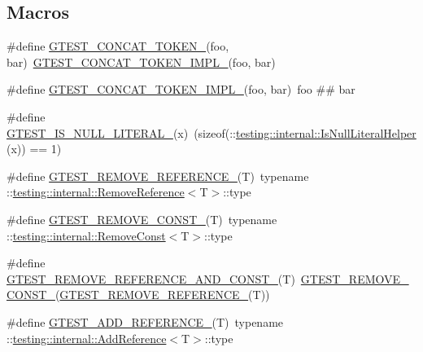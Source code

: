 \subsection*{Macros}
\begin{DoxyCompactItemize}
\item 
\#define \hyperlink{gtest-internal_8h_ae3c336cbe1ae2bd1b1d019333e4428a0}{G\+T\+E\+S\+T\+\_\+\+C\+O\+N\+C\+A\+T\+\_\+\+T\+O\+K\+E\+N\+\_\+}(foo,  bar)~\hyperlink{gtest-internal_8h_aa39fb5346d3573feebe4257cb3a01fde}{G\+T\+E\+S\+T\+\_\+\+C\+O\+N\+C\+A\+T\+\_\+\+T\+O\+K\+E\+N\+\_\+\+I\+M\+P\+L\+\_\+}(foo, bar)
\item 
\#define \hyperlink{gtest-internal_8h_aa39fb5346d3573feebe4257cb3a01fde}{G\+T\+E\+S\+T\+\_\+\+C\+O\+N\+C\+A\+T\+\_\+\+T\+O\+K\+E\+N\+\_\+\+I\+M\+P\+L\+\_\+}(foo,  bar)~foo \#\# bar
\item 
\#define \hyperlink{gtest-internal_8h_ae5dd8e23090e08856613878fa1ff6fca}{G\+T\+E\+S\+T\+\_\+\+I\+S\+\_\+\+N\+U\+L\+L\+\_\+\+L\+I\+T\+E\+R\+A\+L\+\_\+}(x)~(sizeof(\+::\hyperlink{namespacetesting_1_1internal_afb0731ba39ffef1fa1730ac0699c9025}{testing\+::internal\+::\+Is\+Null\+Literal\+Helper}(x)) == 1)
\item 
\#define \hyperlink{gtest-internal_8h_a84c72f25a6a6600e3ff8381ca6982ae9}{G\+T\+E\+S\+T\+\_\+\+R\+E\+M\+O\+V\+E\+\_\+\+R\+E\+F\+E\+R\+E\+N\+C\+E\+\_\+}(T)~typename \+::\hyperlink{structtesting_1_1internal_1_1_remove_reference}{testing\+::internal\+::\+Remove\+Reference}$<$T$>$\+::type
\item 
\#define \hyperlink{gtest-internal_8h_a2ffec8c60510eb130af387f5ce9a756a}{G\+T\+E\+S\+T\+\_\+\+R\+E\+M\+O\+V\+E\+\_\+\+C\+O\+N\+S\+T\+\_\+}(T)~typename \+::\hyperlink{structtesting_1_1internal_1_1_remove_const}{testing\+::internal\+::\+Remove\+Const}$<$T$>$\+::type
\item 
\#define \hyperlink{gtest-internal_8h_a874567b176266188fabfffb8393267ce}{G\+T\+E\+S\+T\+\_\+\+R\+E\+M\+O\+V\+E\+\_\+\+R\+E\+F\+E\+R\+E\+N\+C\+E\+\_\+\+A\+N\+D\+\_\+\+C\+O\+N\+S\+T\+\_\+}(T)~\hyperlink{gtest-internal_8h_a2ffec8c60510eb130af387f5ce9a756a}{G\+T\+E\+S\+T\+\_\+\+R\+E\+M\+O\+V\+E\+\_\+\+C\+O\+N\+S\+T\+\_\+}(\hyperlink{gtest-internal_8h_a84c72f25a6a6600e3ff8381ca6982ae9}{G\+T\+E\+S\+T\+\_\+\+R\+E\+M\+O\+V\+E\+\_\+\+R\+E\+F\+E\+R\+E\+N\+C\+E\+\_\+}(T))
\item 
\#define \hyperlink{gtest-internal_8h_ab389953fc1f7e4efae30d182a0e0a13b}{G\+T\+E\+S\+T\+\_\+\+A\+D\+D\+\_\+\+R\+E\+F\+E\+R\+E\+N\+C\+E\+\_\+}(T)~typename \+::\hyperlink{structtesting_1_1internal_1_1_add_reference}{testing\+::internal\+::\+Add\+Reference}$<$T$>$\+::type

\end{DoxyCompactItemize}
